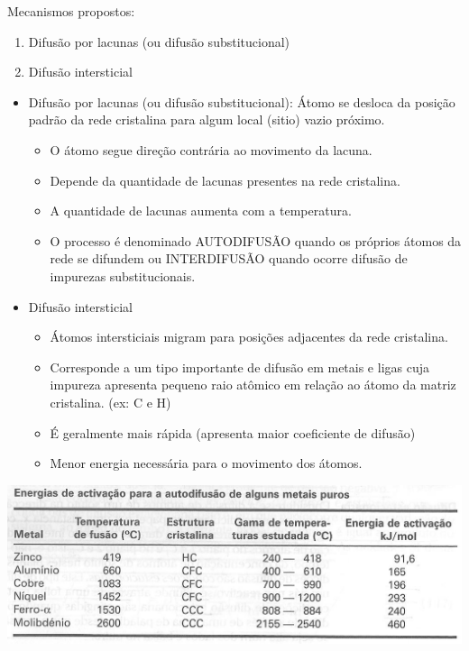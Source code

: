 Mecanismos propostos:

\begin{enumerate}
	\item Difusão por lacunas (ou difusão substitucional)
	\item Difusão intersticial
	
\end{enumerate}


\begin{itemize}
	\item Difusão por lacunas (ou difusão substitucional): Átomo se desloca da posição padrão da rede cristalina para algum local (sitio) vazio próximo.
	\begin{itemize}
		\item O átomo segue direção contrária ao movimento da lacuna.
		\item Depende da quantidade de lacunas presentes na rede cristalina.
		\item A quantidade de lacunas aumenta com a temperatura.
		\item O processo é denominado AUTODIFUSÃO quando os próprios átomos da rede se difundem ou INTERDIFUSÃO quando ocorre difusão de impurezas substitucionais.
	\end{itemize}
	\item Difusão intersticial
	\begin{itemize}
		\item Átomos intersticiais migram para posições adjacentes da rede cristalina.
		\item Corresponde a um tipo importante de difusão em metais e ligas cuja impureza apresenta pequeno raio atômico em relação ao átomo da matriz cristalina. (ex: C e H)
		\item É geralmente mais rápida (apresenta maior coeficiente de difusão)
		\item Menor energia necessária para o movimento dos átomos.
	\end{itemize}
\end{itemize}

\includegraphics[scale=0.4,trim={0 0 0 0}]{figures/Eativacao}

